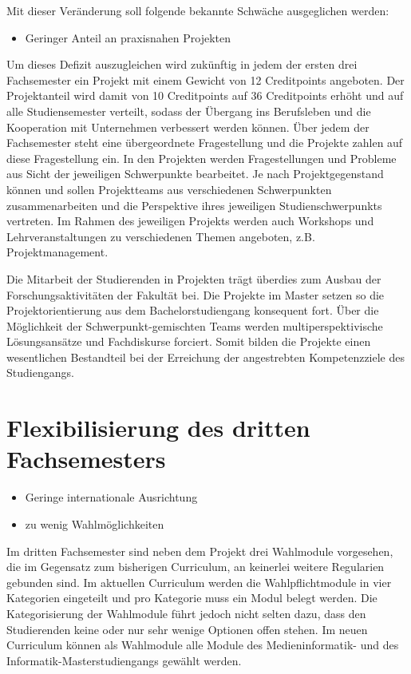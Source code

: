 Mit dieser Veränderung soll folgende bekannte Schwäche ausgeglichen
werden:

\begin{itemize}
\tightlist
\item
  Geringer Anteil an praxisnahen Projekten
\end{itemize}

Um dieses Defizit auszugleichen wird zukünftig in jedem der ersten drei
Fachsemester ein Projekt mit einem Gewicht von 12 Creditpoints
angeboten. Der Projektanteil wird damit von 10 Creditpoints auf 36
Creditpoints erhöht und auf alle Studiensemester verteilt, sodass der
Übergang ins Berufsleben und die Kooperation mit Unternehmen verbessert
werden können. Über jedem der Fachsemester steht eine übergeordnete
Fragestellung und die Projekte zahlen auf diese Fragestellung ein. In
den Projekten werden Fragestellungen und Probleme aus Sicht der
jeweiligen Schwerpunkte bearbeitet. Je nach Projektgegenstand können und
sollen Projektteams aus verschiedenen Schwerpunkten zusammenarbeiten und
die Perspektive ihres jeweiligen Studienschwerpunkts vertreten. Im
Rahmen des jeweiligen Projekts werden auch Workshops und
Lehrveranstaltungen zu verschiedenen Themen angeboten, z.B.
Projektmanagement.

Die Mitarbeit der Studierenden in Projekten trägt überdies zum Ausbau
der Forschungsaktivitäten der Fakultät bei. Die Projekte im Master
setzen so die Projektorientierung aus dem Bachelorstudiengang konsequent
fort. Über die Möglichkeit der Schwerpunkt-gemischten Teams werden
multiperspektivische Lösungsansätze und Fachdiskurse forciert. Somit
bilden die Projekte einen wesentlichen Bestandteil bei der Erreichung
der angestrebten Kompetenzziele des Studiengangs.

\section{Flexibilisierung des dritten
Fachsemesters}\label{flexibilisierung-des-dritten-fachsemesters}

\begin{itemize}
\tightlist
\item
  Geringe internationale Ausrichtung
\item
  zu wenig Wahlmöglichkeiten
\end{itemize}

Im dritten Fachsemester sind neben dem Projekt drei Wahlmodule
vorgesehen, die im Gegensatz zum bisherigen Curriculum, an keinerlei
weitere Regularien gebunden sind. Im aktuellen Curriculum werden die
Wahlpflichtmodule in vier Kategorien eingeteilt und pro Kategorie muss
ein Modul belegt werden. Die Kategorisierung der Wahlmodule führt jedoch
nicht selten dazu, dass den Studierenden keine oder nur sehr wenige
Optionen offen stehen. Im neuen Curriculum können als Wahlmodule alle
Module des Medieninformatik- und des Informatik-Masterstudiengangs
gewählt werden.

